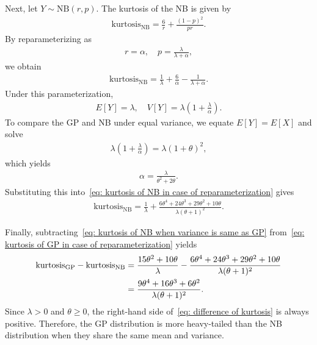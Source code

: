 \documentclass[pdflatex,sn-basic]{sn-jnl}%
\theoremstyle{thmstyleone}%
\theoremstyle{thmstyletwo}%
\theoremstyle{thmstylethree}%
\begin{document}
\begin{appendices}
Next, let $Y \sim \mathrm{NB}(r, p)$.  
The kurtosis of the NB is given by
\begin{align}
	\mathrm{kurtosis}_{\text{NB}} = \frac{6}{r} + \frac{(1 - p)^{2}}{pr}. \label{eq: kurtosis of NB}
\end{align}
By reparameterizing as
\begin{align}
	r = \alpha, \quad p = \frac{\lambda}{\lambda + \alpha},
\end{align}
we obtain
\begin{align}
	\mathrm{kurtosis}_{\text{NB}} = \frac{1}{\lambda} + \frac{6}{\alpha} - \frac{1}{\lambda + \alpha}. \label{eq: kurtosis of NB in case of reparameterization}
\end{align}
Under this parameterization,
\begin{align}
	E[Y] = \lambda, \quad V[Y] = \lambda \left( 1 + \frac{\lambda}{\alpha} \right).
\end{align}
To compare the GP and NB under equal variance, we equate $E[Y] = E[X]$ and solve
\begin{align}
	\lambda \left( 1 + \frac{\lambda}{\alpha} \right) = \lambda (1 + \theta)^{2},
\end{align}
which yields
\begin{align}
	\alpha = \frac{\lambda}{\theta^{2} + 2\theta}.
\end{align}
Substituting this into~\eqref{eq: kurtosis of NB in case of reparameterization} gives
\begin{align}
	\mathrm{kurtosis}_{\text{NB}} = 
	\frac{1}{\lambda} + \frac{6\theta^{4} + 24\theta^{3} + 29\theta^{2} + 10\theta}
	{\lambda(\theta + 1)^{2}}. \label{eq: kurtosis of NB when variance is same as GP}
\end{align}

Finally, subtracting~\eqref{eq: kurtosis of NB when variance is same as GP} from~\eqref{eq: kurtosis of GP in case of reparameterization} yields
\begin{align}
	\mathrm{kurtosis}_{\text{GP}} - \mathrm{kurtosis}_{\text{NB}}
	&= \frac{15\theta^{2} + 10\theta}{\lambda}
	   - \frac{6\theta^{4} + 24\theta^{3} + 29\theta^{2} + 10\theta}
	          {\lambda(\theta + 1)^{2}} \notag\\
	&= \frac{9\theta^{4} + 16\theta^{3} + 6\theta^{2}}
	          {\lambda(\theta + 1)^{2}}. \label{eq: difference of kurtosis}
\end{align}
Since $\lambda > 0$ and $\theta \ge 0$, the right-hand side of~\eqref{eq: difference of kurtosis} is always positive.  
Therefore, the GP distribution is more heavy-tailed than the NB distribution when they share the same mean and variance.



\end{appendices}
\end{document}
